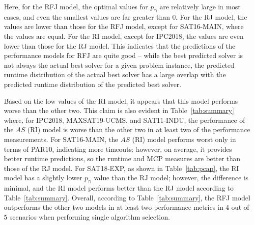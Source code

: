 Here, for the RFJ model, the optimal values for $p_{\cap}$ are relatively large in most cases, and even the smallest values are far greater than 0. For the RJ model, the values are lower than those for the RFJ model, except for SAT16-MAIN, where the values are equal. For the RI model, except for IPC2018, the values are even lower than those for the RJ model. This indicates that the predictions of the performance models for RFJ are quite good -- while the best predicted solver is not always the actual best solver for a given problem instance, the predicted runtime distribution of the actual best solver has a large overlap with the predicted runtime distribution of the predicted best solver. 

Based on the low values of the RI model, it appears that this model performs worse than the other two. This claim is also evident in Table~\ref{tab:summary} where, for IPC2018, MAXSAT19-UCMS, and SAT11-INDU, the performance of the $AS$ (RI) model is worse than the other two in at least two of the performance measurements. For SAT16-MAIN, the $AS$ (RI) model performs worst only in terms of PAR10, indicating more timeouts; however, on average, it provides better runtime predictions, so the runtime and MCP measures are better than those of the RJ model. For SAT18-EXP, as shown in Table~\ref{tab:pcap}, the RI model has a slightly lower $p_{\cap}$ value than the RJ model; however, the difference is minimal, and the RI model performs better than the RJ model according to Table~\ref{tab:summary}. Overall, according to Table~\ref{tab:summary}, the RFJ model outperforms the other two models in at least two performance metrics in 4 out of 5 scenarios when performing single algorithm selection.


